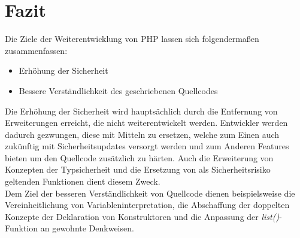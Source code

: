 \section{Fazit}
Die Ziele der Weiterentwicklung von \acs{PHP} lassen sich folgendermaßen zusammenfassen:
\begin{itemize}
    \item Erhöhung der Sicherheit
    \item Bessere Verständlichkeit des geschriebenen Quellcodes
\end{itemize}  
Die Erhöhung der Sicherheit wird hauptsächlich durch die Entfernung von Erweiterungen erreicht, die nicht weiterentwickelt werden. Entwickler werden dadurch gezwungen,
diese mit Mitteln zu ersetzen, welche zum Einen auch zukünftig mit Sicherheitsupdates versorgt werden und zum Anderen Features bieten um den Quellcode zusätzlich
zu härten. Auch die Erweiterung von Konzepten der Typsicherheit und die Ersetzung von als Sicherheitsrisiko geltenden Funktionen dient diesem Zweck.\\
Dem Ziel der besseren Verständlichkeit von Quellcode dienen beispielsweise die Vereinheitlichung von Variableninterpretation, die Abschaffung der doppelten Konzepte
der Deklaration von Konstruktoren und die Anpassung der \textit{list()}-Funktion an gewohnte Denkweisen.\\